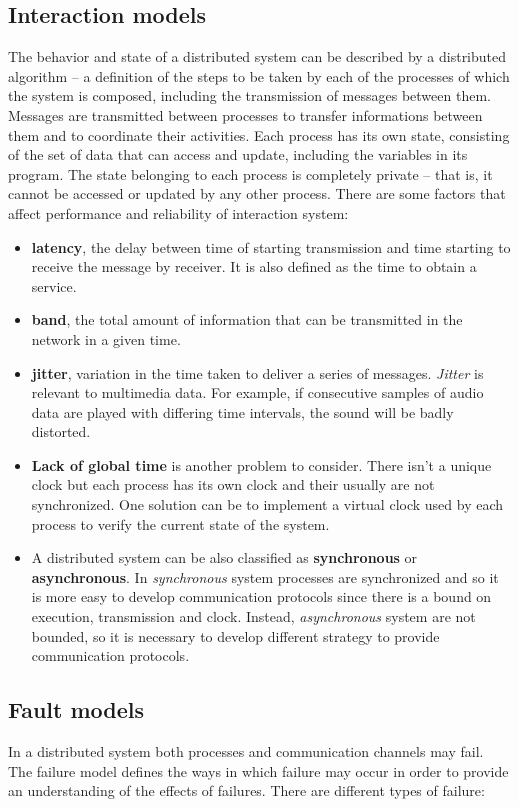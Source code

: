 \documentclass[11pt,a4paper]{article}
\begin{document}
\subsection{Interaction models}
The behavior and state of a distributed system can be described by a distributed algorithm – a definition of the steps to be taken by each of the processes of which the system is composed, including the transmission of messages between them. Messages are transmitted between processes to transfer informations between them and to coordinate their activities.
Each process has its own state, consisting of the set of data that can access and update, including the variables in its program. The state belonging to each process is completely private – that is, it cannot be accessed or updated by any other process.
There are some factors that affect performance and reliability of interaction system:
\begin{itemize}
	\item \textbf{latency}, the delay between time of starting transmission and time starting to receive the message by receiver. It is also defined as the time to obtain a service.
	\item \textbf{band}, the total amount of information that can be transmitted in the network in a given time.
	\item \textbf{jitter}, variation in the time taken to deliver a series of messages. \textit{Jitter} is relevant to multimedia data. For example, if consecutive samples of audio data are played with differing time intervals, the sound will be badly distorted.
	\item \textbf{Lack of global time} is another problem to consider. There isn't a unique clock but each process has its own clock and their usually are not synchronized. One solution can be to implement a virtual clock used by each process to verify the current state of the system.
	\item A distributed system can be also classified as \textbf{synchronous} or \textbf{asynchronous}. In \textit{synchronous} system processes are synchronized and so it is more easy to develop communication protocols since there is a bound on execution, transmission and clock. Instead, \textit{asynchronous} system are not bounded, so it is necessary to develop different strategy to provide communication protocols.
\end{itemize}

\subsection{Fault models}
In a distributed system both processes and communication channels may fail. The failure model defines the ways in which failure may occur in order to provide an understanding of the effects of failures.
There are different types of failure:
\end{document}
